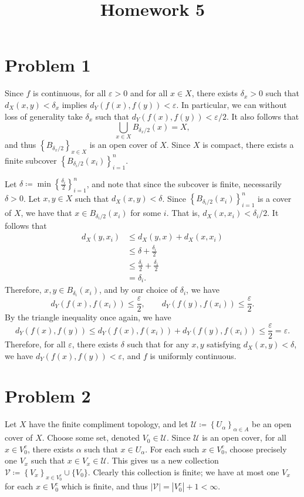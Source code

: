 \documentclass[11pt, letterpaper]{article}
\title{Homework 5}
\begin{document}
\makeproblem
\section*{Problem 1}
Since $f$ is continuous, for all $\varepsilon >0$ and for all $x\in X$, there exists $\delta_x>0$ such that $d_X(x,y)<\delta_x $ implies $d_Y(f(x),f(y))<\varepsilon $. In particular, we can without loss of generality take $\delta_x$ such that $d_Y(f(x),f(y))<\varepsilon /2$. It also follows that
\[
	\bigcup_{x\in X} B_{\delta _x/2} (x)=X
,\]
and thus $\left\{ B_{\delta _x/2}  \right\}_{x\in X} $ is an open cover of $X$. Since $X$ is compact, there exists a finite subcover $\left\{ B_{\delta_i/2}(x_i)  \right\}_{i=1}^n$.

Let $\delta \coloneqq \min \left\{ \frac{\delta _i}{2} \right\}_{i=1}^n$, and note that since the subcover is finite, necessarily $\delta >0$. Let $x,y\in X$ such that $d_X(x,y)<\delta $. Since $\left\{ B_{\delta_i/2} (x_i) \right\}_{i=1}^n$ is a cover of $X$, we have that $x\in B_{\delta _i/2} (x_i)$ for some $i$. That is, $d_X(x,x_i)<\delta_i/2$. It follows that
\begin{align*}
	d_X(y,x_i)&\leq d_X(y,x)+d_X(x,x_i)\\
		  &\leq \delta +\frac{\delta_i}{2} \\
		  &\leq \frac{\delta_i}{2} +\frac{\delta _i}{2} \\
		  &=\delta _i
.\end{align*}
Therefore, $x,y\in B_{\delta _i} (x_i)$, and by our choice of $\delta_i$, we have
\[
	d_Y(f(x),f(x_i))\leq \frac{\varepsilon }{2} ,\qquad d_Y(f(y),f(x_i))\leq \frac{\varepsilon }{2} 
.\]
By the triangle inequality once again, we have
\[
	d_Y(f(x),f(y))\leq d_Y(f(x),f(x_i))+d_Y(f(y),f(x_i))\leq \frac{\varepsilon }{2} =\varepsilon 
.\]
Therefore, for all $\varepsilon $, there exists $\delta $ such that for any $x,y$ satisfying $d_X(x,y)<\delta $, we have $d_Y(f(x),f(y))<\varepsilon $, and $f$ is uniformly continuous.
\section*{Problem 2}
Let $X$ have the finite compliment topology, and let $\mathcal{U} \coloneqq \left\{ U_\alpha  \right\}_{\alpha \in A} $ be an open cover of $X$. Choose some set, denoted $V_0 \in \mathcal{U} $. Since $\mathcal{U} $ is an open cover, for all $x\in V_0^{c} $, there exists $\alpha $ such that $x\in U_{\alpha } $. For each such $x\in V_0^{c} $, choose precisely one $V_x$ such that $x\in V_x\in \mathcal{U} $. This gives us a new collection $\mathcal{V} \coloneqq \left\{ V_x \right\}_{x\in V_0^{c} }\cup \{V_0\}$. Clearly this collection is finite; we have at most one $V_x$ for each $x\in V_0^{c} $ which is finite, and thus $\left| \mathcal{V}  \right| =\left| V_0^{c}  \right| +1<\infty $.
\end{document}
